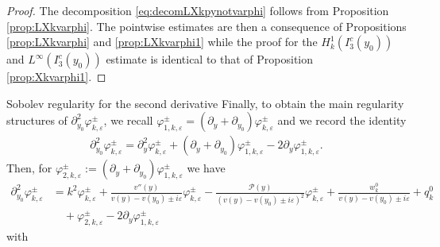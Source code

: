 \documentclass[11pt,reqno]{amsproc}
\makeatletter
\renewcommand\subsection{\@startsection{subsection}{2}%
\normalparindent{.5\linespacing\@plus.7\linespacing}{-.5em}
{\normalfont\bfseries}}
\theoremstyle{definition}
\numberwithin{equation}{section}
\newcommand{\ep}{\varepsilon}
\renewcommand{\P}{{\mathcal{P}}}
\makeatother
\begin{document}
\begin{proof}
The decomposition \eqref{eq:decomLXkpynotvarphi} follows from Proposition \ref{prop:LXkvarphi}. The pointwise estimates are then a consequence of Propositions \ref{prop:LXkvarphi} and \ref{prop:LXkvarphi1} while the proof for the $H_{k}^1(I_3^c(y_0))$ and $L^\infty(I_3^c(y_0))$ estimate is identical to that of Proposition \ref{prop:Xkvarphi1}. 
\end{proof}





\subsection{Sobolev regularity for the second derivative}
Finally, to obtain the main regularity structures of $\partial^2_{y_0}\varphi_{k,\ep}^\pm$, we recall $\varphi_{1,k,\ep}^\pm=(\partial_y + \partial_{y_0})\varphi_{k,\ep}^\pm$ and we record the identity
\begin{align*}
\partial_{y_0}^2\varphi_{k,\ep}^\pm = \partial_y^2\varphi_{k,\ep}^\pm + \left( \partial_y + \partial_{y_0}\right)\varphi_{1,k,\ep}^\pm -2\partial_y \varphi_{1,k,\ep}^\pm.
\end{align*}
Then, for $\varphi_{2,k,\ep}^\pm :=(\partial_y + \partial_{y_0})\varphi_{1,k,\ep}^\pm$ we have
\begin{align*}
\partial_{y_0}^2\varphi_{k,\ep}^\pm &= k^2\varphi_{k,\ep}^\pm + \frac{v''(y)}{v(y) - v(y_0) \pm i\ep}\varphi_{k,\ep}^\pm - \frac{\P(y)}{(v(y) - v(y_0) \pm i\ep)^2}\varphi_{k,\ep}^\pm + \frac{w_k^0}{v(y) - v(y_0) \pm i\ep} + q_k^0 \\ 
&\quad+ \varphi_{2,k,\ep}^\pm -2\partial_y \varphi_{1,k,\ep}^\pm
\end{align*}
with 
\end{document}

